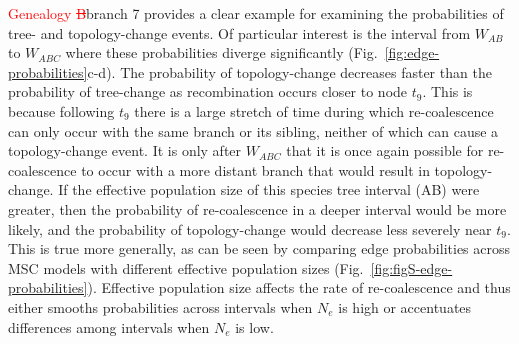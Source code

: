 \documentclass[11pt]{article}
\begin{document}

\textcolor{red}{Genealogy \sout{B}}branch 7 provides a clear example for examining the probabilities of 
tree- and topology-change events. Of particular interest is the 
interval from $W_{AB}$ to $W_{ABC}$ where these probabilities diverge 
significantly (Fig.~\ref{fig:edge-probabilities}c-d). 
The probability of topology-change decreases faster than the probability of 
tree-change as recombination occurs closer to node $t_9$. This is because 
following $t_9$ there is a large stretch of time during which re-coalescence can
only occur with the same branch or its sibling, neither of which can cause a topology-change
event. It is only after $W_{ABC}$ that it is once again possible for re-coalescence
to occur with a more distant branch that would result in topology-change. 
If the effective population size of this species tree interval (AB) were greater,
then the probability of re-coalescence in a deeper interval would be more likely, 
and the probability of topology-change would decrease less severely near $t_9$. 
This is true more generally, as can be seen by comparing edge probabilities
across MSC models with different effective population sizes (Fig.~\ref{fig:figS-edge-probabilities}).
Effective population size affects the rate of re-coalescence and thus 
either smooths probabilities across intervals when 
$N_e$ is high or accentuates differences among intervals when $N_e$ is low.

\end{document}
